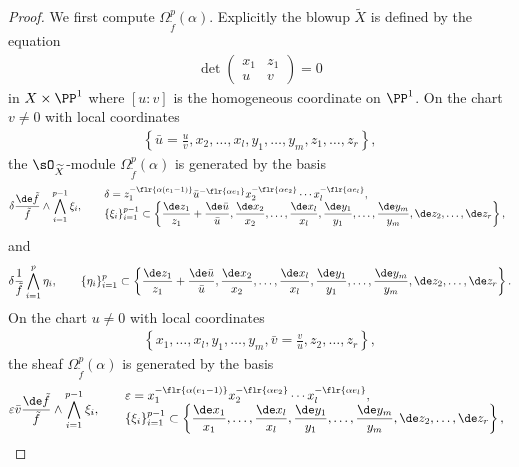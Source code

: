 \begin{proof}
We first compute $\Omega_{\tilde{f}}^p(\alpha)$. Explicitly the blowup $\widetilde{X}$ is defined by the equation
\begin{gather*} \det \begin{pmatrix}
x_1 & z_1 \\
u & v
\end{pmatrix}
= 0 \end{gather*}
in $X\times\PP^1$ where $[u:v]$ is the homogeneous coordinate on $\PP^1$. On the chart $v\neq 0$ with local coordinates
\begin{gather*} \left\{ \bar{u} = \frac{u}{v},x_2,\dots, x_l, y_1, \dots, y_m,z_1, \dots, z_r \right\}, \end{gather*}
the $\sO_{\widetilde{X}}$-module $\Omega_{\tilde{f}}^p(\alpha)$ is generated by the basis
\begin{gather}\label{eq:chart-u-1}
\delta\frac{\de \tilde{f}}{\tilde{f}}\wedge\bigwedge_{i=1}^{p-1}\xi_i,
\qquad\begin{array}{@{}l}
\delta = z_1^{-\flr{\alpha(e_1-1)}}\bar{u}^{-\flr{\alpha e_1}}	x_2^{-\flr{\alpha e_2}}\cdots x_l^{-\flr{\alpha e_l}}, \\
\displaystyle \{\xi_i \}_{i=1}^{p-1} \subset \left\{ \frac{\de z_1}{z_1} + \frac{\de\bar{u}}{\bar{u}},\frac{\de x_2}{x_2},\dots, \frac{\de x_l}{x_l},\frac{\de y_1}{y_1},\dots, \frac{\de y_m}{y_m}, \de z_2,\dots, \de z_r \right\},
\end{array}
\end{gather}
and
\begin{gather}\label{eq:chart-u-2}
\delta\frac{1}{\tilde{f}}\bigwedge_{i=1}^p\eta_i,\qquad
\{\eta_i \}_{i=1}^p \subset\left\{ \frac{\de z_1}{z_1} + \frac{\de\bar{u}}{\bar{u}},\frac{\de x_2}{x_2},\dots, \frac{\de x_l}{x_l},\frac{\de y_1}{y_1},\dots, \frac{\de y_m}{y_m},\de z_2,\dots, \de z_r \right\}.
\end{gather}
On the chart $u\neq 0$ with local coordinates
\begin{gather*} \left\{
x_1,\dots, x_l, y_1, \dots, y_m, \bar{v} = \frac{v}{u},z_2, \dots, z_r \right\}, \end{gather*}
the sheaf $\Omega_{\tilde{f}}^p(\alpha)$ is generated by the basis
\begin{gather}\label{eq:chart-v-1}
\varepsilon\bar{v}\frac{\de \tilde{f}}{\tilde{f}}\wedge\bigwedge_{i=1}^{p-1}\xi_i,
\qquad\begin{array}{@{}l}
\varepsilon = x_1^{-\flr{\alpha(e_1-1)}}	x_2^{-\flr{\alpha e_2}}\cdots x_l^{-\flr{\alpha e_l}}, \\
\displaystyle\{\xi_i \}_{i=1}^{p-1} \subset \left\{ \frac{\de x_1}{x_1},\dots, \frac{\de x_l}{x_l},\frac{\de y_1}{y_1},\dots, \frac{\de y_m}{y_m},\de z_2,\dots, \de z_r \right\},

\end{array}
\end{gather}
\end{proof}

